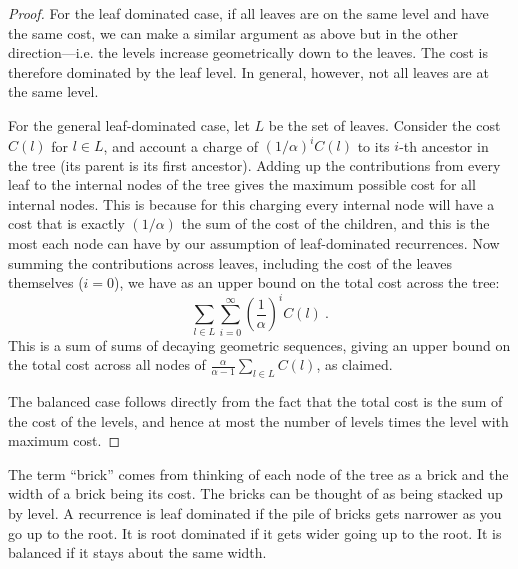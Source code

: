 \begin{flex}
\begin{proof}
  For the leaf dominated case, if all leaves are on the same level and
  have the same cost, we can make a
  similar argument as above but in the other direction---i.e. the
  levels increase geometrically down to the leaves.    The cost is
  therefore dominated by the leaf level.
  In general, however, not all leaves are at the same level.

  For the general leaf-dominated case, let
  $L$ be the set of leaves.
  Consider the cost $C(l)$ for $l \in L$, and account a charge of
  $(1/\alpha)^i C(l)$ to its $i$-th ancestor in the tree (its parent
  is its first ancestor).
  Adding up the contributions from every leaf to the internal nodes of
  the tree gives the maximum possible cost for all internal nodes.
  This is because for this charging every internal node will have a
  cost that is exactly $(1/\alpha)$ the sum of the cost of the
  children, and this is the most each node can have by our assumption of
  leaf-dominated recurrences.
  Now summing the contributions across leaves, including the cost of
  the leaves themselves ($i = 0$), we have as an upper bound on the
  total cost across the tree:
  \[\sum_{l \in L} \sum_{i=0}^{\infty}  \left(\frac{1}{\alpha}\right)^i C(l)~. \]
  This is a sum of sums of decaying geometric sequences, giving an
  upper bound on the total cost
  across all nodes of 
  $\frac{\alpha}{\alpha -1} \sum_{l \in L} C(l)$, as claimed.

  The balanced case follows directly from the fact that the total cost
  is the sum of the cost of the levels, and hence at most the number
  of levels times the level with maximum cost.

\end{proof}
\end{flex}

\begin{cluster}
\label{grp:rmrk:analysis::recurrences::term}

\begin{remark}
\label{rmrk:analysis::recurrences::term}
  The term ``brick'' comes from thinking of each node of the tree as a 
  brick and the width of a brick being its cost.  The bricks can be
  thought of as being stacked up  by level.    A recurrence is leaf dominated if the pile of bricks 
  gets narrower as you go up to the root.  It is root dominated if it 
  gets wider going up to the root.  It is balanced 
  if it stays about the same width. 

\end{remark}
\end{cluster}

